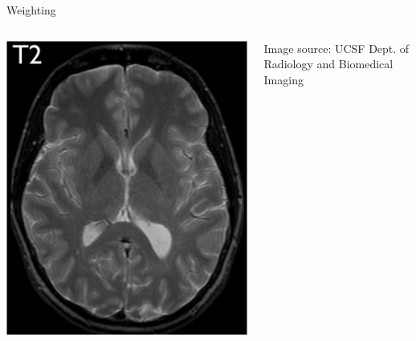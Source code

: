 \begin{frame}{\transtime{} Weighting}
\begin{columns}[t,onlytextwidth]
        \includegraphics[height=0.6\textheight]{images/t2}

        {\scriptsize Image source: UCSF Dept. of Radiology and Biomedical Imaging}
    \end{columns}
\end{frame}

